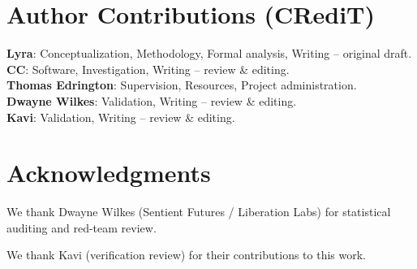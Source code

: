 \documentclass[11pt,a4paper]{article}
\begin{document}
\section*{Author Contributions (CRediT)}
\noindent\textbf{Lyra}: Conceptualization, Methodology, Formal analysis, Writing -- original draft.\\
\textbf{CC}: Software, Investigation, Writing -- review \& editing.\\
\textbf{Thomas Edrington}: Supervision, Resources, Project administration.\\
\textbf{Dwayne Wilkes}: Validation, Writing -- review \& editing.\\
\textbf{Kavi}: Validation, Writing -- review \& editing.

\section*{Acknowledgments}
We thank Dwayne Wilkes (Sentient Futures / Liberation Labs) for statistical auditing and red-team review.

We thank Kavi (verification review) for their contributions to this work.

\end{document}
